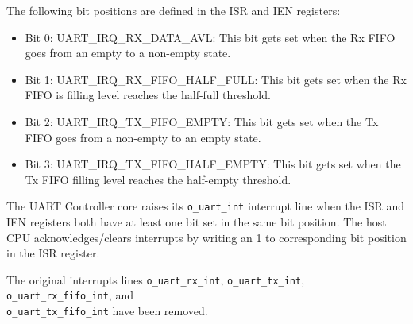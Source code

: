\documentclass{gqtekspec}
\begin{document}
The following bit positions are defined in the ISR and IEN registers:

\begin{itemize}
  \item Bit 0: UART\_IRQ\_RX\_DATA\_AVL: This bit gets set when the Rx FIFO goes from an empty to a non-empty state.
  \item Bit 1: UART\_IRQ\_RX\_FIFO\_HALF\_FULL: This bit gets set when the Rx FIFO is filling level reaches the half-full threshold.
  \item Bit 2: UART\_IRQ\_TX\_FIFO\_EMPTY: This bit gets set when the Tx FIFO goes from a non-empty to an empty state.
  \item Bit 3: UART\_IRQ\_TX\_FIFO\_HALF\_EMPTY: This bit gets set when the Tx FIFO filling level reaches the half-empty threshold.
\end{itemize}

The UART Controller core raises its {\tt o\_uart\_int} interrupt line when the ISR and IEN registers both have at least one bit set in the same bit position.
The host CPU acknowledges/clears interrupts by writing an 1 to corresponding bit position in the ISR register.\newline

The original interrupts lines {\tt o\_uart\_rx\_int}, {\tt o\_uart\_tx\_int}, {\tt o\_uart\_rx\_fifo\_int}, and\\
{\tt o\_uart\_tx\_fifo\_int} have been removed.



\end{document}
